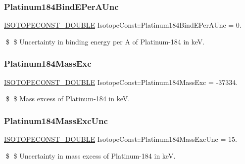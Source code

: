 \subsubsection{\texorpdfstring{Platinum184\+Bind\+E\+Per\+A\+Unc}{Platinum184BindEPerAUnc}}
{\footnotesize\ttfamily \mbox{\hyperlink{group___isotope_const-_macros_ga8f45a7272ce02c0b4c65c44636ed719a}{I\+S\+O\+T\+O\+P\+E\+C\+O\+N\+S\+T\+\_\+\+D\+O\+U\+B\+LE}} Isotope\+Const\+::\+Platinum184\+Bind\+E\+Per\+A\+Unc = 0.}

\$ \$ Uncertainty in binding energy per A of Platinum-\/184 in keV. \mbox{\label{group___isotope_const-_platinum-_pt184_ga5bd53a127442eafdd676686c7328a7f1}} 
\subsubsection{\texorpdfstring{Platinum184\+Mass\+Exc}{Platinum184MassExc}}
{\footnotesize\ttfamily \mbox{\hyperlink{group___isotope_const-_macros_ga8f45a7272ce02c0b4c65c44636ed719a}{I\+S\+O\+T\+O\+P\+E\+C\+O\+N\+S\+T\+\_\+\+D\+O\+U\+B\+LE}} Isotope\+Const\+::\+Platinum184\+Mass\+Exc = -\/37334.}

\$ \$ Mass excess of Platinum-\/184 in keV. \mbox{\label{group___isotope_const-_platinum-_pt184_ga787375a880b80f6425087beb63e33d12}} 
\subsubsection{\texorpdfstring{Platinum184\+Mass\+Exc\+Unc}{Platinum184MassExcUnc}}
{\footnotesize\ttfamily \mbox{\hyperlink{group___isotope_const-_macros_ga8f45a7272ce02c0b4c65c44636ed719a}{I\+S\+O\+T\+O\+P\+E\+C\+O\+N\+S\+T\+\_\+\+D\+O\+U\+B\+LE}} Isotope\+Const\+::\+Platinum184\+Mass\+Exc\+Unc = 15.}

\$ \$ Uncertainty in mass excess of Platinum-\/184 in keV. \mbox{\label{group___isotope_const-_platinum-_pt184_ga351535b50a7c6f68a8e8f17a37311bd2}} 
